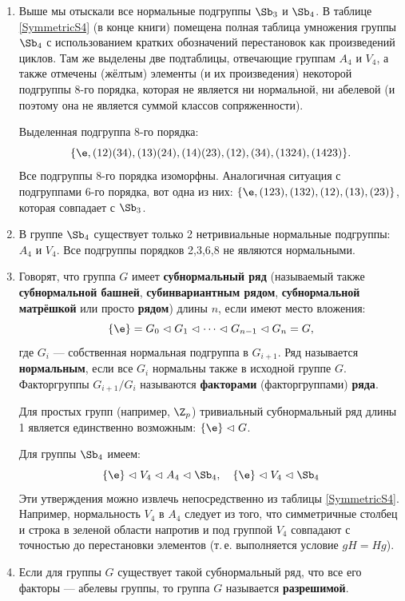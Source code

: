 \begin{enumerate}
\item Выше мы отыскали все нормальные подгруппы $\Sb_3$ и $\Sb_4$. В таблице \ref{SymmetricS4} (в конце книги) помещена полная таблица умножения группы $\Sb_4$ с использованием кратких обозначений перестановок как произведений циклов. Там же выделены две подтаблицы, отвечающие группам $A_4$ и $V_4$, а также отмечены (жёлтым) элементы (и их произведения) некоторой подгруппы 8-го порядка, которая не является ни нормальной, ни абелевой (и поэтому она не является суммой классов сопряженности).

Выделенная подгруппа 8-го порядка:
$$\{\e, (12)(34), (13)(24), (14)(23), (12), (34), (1324), (1423)\}.
$$
Все подгруппы 8-го порядка изоморфны. Аналогичная ситуация с подгруппами 6-го порядка, вот одна из них:
$\{\e, (123), (132), (12), (13), (23) \}$, которая совпадает с $\Sb_3$.

\item В группе $\Sb_4$ существует только 2 нетривиальные нормальные подгруппы: $A_4$ и $V_4$. Все подгруппы порядков 2,3,6,8 не являются нормальными.

\item Говорят, что группа $G$ имеет \textbf{субнормальный ряд} (называемый также \textbf{субнормальной башней}, \textbf{субинвариантным рядом}, \textbf{субнормальной матрёшкой} или просто \textbf{рядом}) длины $n$, если имеют место вложения:
$$
\{\e\}=G_0\vartriangleleft G_1\vartriangleleft\dots\vartriangleleft G_{n-1}\vartriangleleft G_n=G,
$$
где $G_i$ --- собственная нормальная подгруппа в $G_{i+1}$. Ряд называется \textbf{нормальным}, если все $G_i$ нормальны также в исходной группе $G$. Факторгруппы $G_{i+1}/G_i$ называются \textbf{факторами} (факторгруппами) \textbf{ряда}.

Для простых групп (например, $\Z_p$) тривиальный субнормальный ряд длины 1 является единственно возможным: $\{\e\}\vartriangleleft G$.

Для группы $\Sb_4$ имеем: 
$$
\{\e\}\vartriangleleft V_4\vartriangleleft A_4\vartriangleleft\Sb_4,\quad\{\e\}\vartriangleleft V_4\vartriangleleft\Sb_4
$$
Эти утверждения можно извлечь непосредственно из таблицы \ref{SymmetricS4}. Например, нормальность $V_4$ в $A_4$ следует из того, что симметричные столбец и строка в зеленой области напротив и под группой $V_4$ совпадают с точностью до перестановки элементов (т.\,е. выполняется условие $gH=Hg$).

\item Если для группы $G$ существует такой субнормальный ряд, что все его факторы --- абелевы группы, то группа $G$ называется \textbf{разрешимой}.


\end{enumerate}
